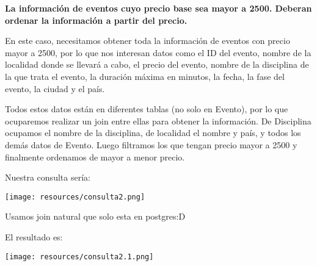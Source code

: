 \textbf{La información de eventos cuyo precio base sea mayor a 2500. Deberan ordenar la información a partir
del precio.}\vspace{.3cm}

En este caso, necesitamos obtener toda la información de eventos con precio mayor a 2500, por lo que nos interesan datos como el ID del evento, nombre de la localidad donde se llevará a cabo, el precio del evento, nombre de la disciplina de la que trata el evento, la duración máxima en minutos, la fecha, la fase del evento, la ciudad y el país. 

Todos estos datos están en diferentes tablas (no solo en Evento), por lo que ocuparemos realizar un join entre ellas para obtener la información. De Disciplina ocupamos el nombre de la disciplina, de localidad el nombre y país, y todos los demás datos de Evento. Luego filtramos los que tengan precio mayor a 2500 y finalmente ordenamos de mayor a menor precio. 

Nuestra consulta sería:

\begin{center}
    \texttt{[image: resources/consulta2.png]}
\end{center}

Usamos join natural que solo esta en postgres:D

El resultado es:
\begin{center}
    
\texttt{[image: resources/consulta2.1.png]}
\end{center}